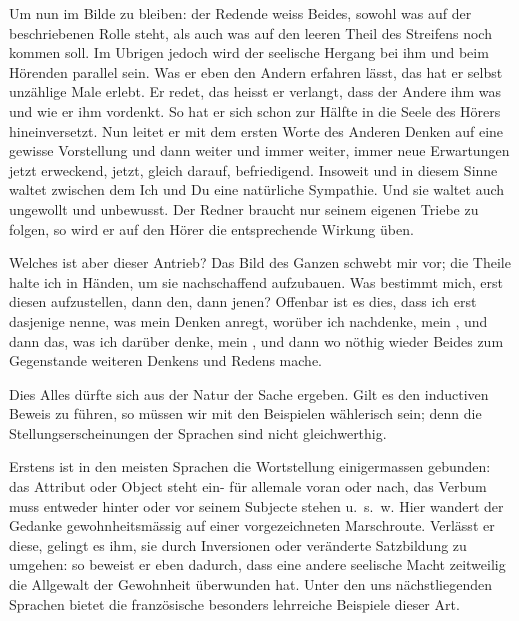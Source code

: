 Um nun im Bilde zu bleiben: der Redende weiss Beides, sowohl was auf der beschriebenen Rolle steht, als auch was auf den leeren Theil des Streifens noch kommen soll. Im Ubrigen jedoch wird der seelische Hergang bei ihm und beim Hörenden parallel sein. Was er eben den Andern erfahren lässt, das hat er selbst unzählige Male erlebt. Er redet, das heisst er verlangt, dass der Andere ihm  was und wie er ihm vordenkt. So hat er sich schon zur Hälfte in die Seele des Hörers hineinversetzt. Nun leitet er mit dem ersten Worte des Anderen Denken auf eine gewisse Vorstellung und dann weiter und immer weiter, immer neue Erwartungen jetzt erweckend, jetzt, gleich darauf, befriedigend. Insoweit und in diesem Sinne waltet zwischen dem Ich und  Du eine natürliche Sympathie. Und sie waltet auch ungewollt und unbewusst. Der Redner braucht nur seinem eigenen Triebe zu folgen, so wird er auf den Hörer die entsprechende Wirkung üben.

Welches ist aber dieser Antrieb? Das Bild des Ganzen schwebt mir vor; die Theile halte ich in Händen, um sie nachschaffend aufzubauen. Was bestimmt mich, erst diesen aufzustellen, dann den, dann jenen? Offenbar ist es dies, dass ich erst dasjenige nenne, was mein Denken anregt, worüber ich nachdenke, mein , und \label{fp.354} dann das, was ich darüber denke, \label{sp.370} mein , und dann wo nöthig wieder Beides zum Gegenstande weiteren Denkens und Redens mache.

Dies Alles dürfte sich aus der Natur der Sache ergeben. Gilt es  den inductiven Beweis zu führen, so müssen wir mit den Beispielen wählerisch sein; denn die Stellungserscheinungen der Sprachen sind nicht gleichwerthig.

Erstens ist in den meisten Sprachen die Wortstellung einigermassen gebunden: das Attribut oder Object steht ein- für allemale voran oder nach, das Verbum muss entweder hinter oder vor seinem Subjecte stehen u.~s.~w. Hier wandert der Gedanke gewohnheitsmässig auf einer vorgezeichneten Marschroute. Verlässt er diese, gelingt es ihm, sie durch Inversionen oder veränderte Satzbildung zu umgehen: so beweist er eben dadurch, dass eine andere seelische Macht zeitweilig die Allgewalt der Gewohnheit überwunden hat. Unter den uns nächstliegenden Sprachen bietet die französische besonders lehrreiche Beispiele dieser Art.

